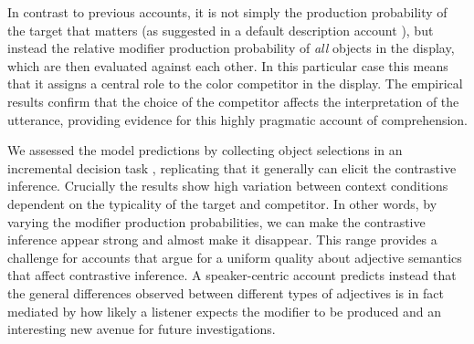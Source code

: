 \documentclass[10pt,letterpaper]{article}
\newcommand{\ek}[1]{\textcolor{Orange}{[ek: #1]}}
\begin{document}
In contrast to previous accounts, it is not simply the production probability of the target that matters (as suggested in a default description account \cite{Sedivy:2003}), but instead the relative modifier production probability of \emph{all} objects in the display, which are then evaluated against each other. In this particular case this means that it assigns a central role to the color competitor in the display. The empirical results confirm that the choice of the competitor affects the interpretation of the utterance, providing evidence for this highly pragmatic account of comprehension.

We assessed the model predictions by collecting object selections in an incremental decision task \cite{Qing:2018}, replicating that it generally can elicit the contrastive inference. Crucially the results show high variation between context conditions dependent on the typicality of the target and competitor. In other words, by varying the modifier production probabilities, we can make the contrastive inference appear strong and almost make it disappear. This range provides a challenge for accounts that argue for a uniform quality about adjective semantics that affect contrastive inference. A speaker-centric account predicts instead that the general differences observed between different types of adjectives is in fact mediated by how likely a listener expects the modifier to be produced and an interesting new avenue for future investigations.

















\end{document}
